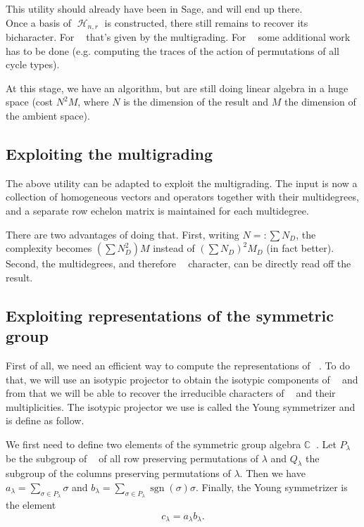 \documentclass[letter,12pt]{article}
\newcommand{\CC}{\mathbb{C}}
\DeclareMathOperator{\Sn}{\mathbb{S}_n}
\DeclareMathOperator{\GLr}{GL_r}
\DeclareMathOperator{\harmonics}{\mathcal{H}}
\DeclareMathOperator{\sgn}{sgn}
\begin{document}
	This utility should already have been in Sage, and will end up there. \\
	
	Once a basis of $\harmonics_{n,r}$ is constructed, there still remains to recover its bicharacter. For $\GLr$ that's given by the multigrading. For $\Sn$ some additional work has to be done (e.g. computing the traces of the action of permutations of all cycle types).
	
	At this stage, we have an algorithm, but are still doing linear algebra in a huge space (cost $N^2 M$, where $N$ is the dimension of the result and $M$ the dimension of the ambient space).
	
	\subsection{Exploiting the multigrading}
	
	The above utility can be adapted to exploit the multigrading. The input is now a collection of homogeneous vectors and operators together with their multidegrees, and a separate row echelon matrix is maintained for each multidegree.
	
	There are two advantages of doing that. 
	First, writing $N=:\sum N_D$, the complexity becomes $(\sum N_D^2) M$ instead of $(\sum N_D)^2M_D$ (in fact better).
	Second, the multidegrees, and therefore $\GLr$ character, can be directly read off the result.
	
	\subsection{Exploiting representations of the symmetric group}
	
	First of all, we need an efficient way to compute the representations of $\Sn$. To do that, we will use an isotypic projector to obtain the isotypic components of $\Sn$ and from that we will be able to recover the irreducible characters of $\Sn$ and their multiplicities. 
	The isotypic projector we use is called the Young symmetrizer and is define as follow.
	
	We first need to define two elements of the symmetric group algebra $\CC \Sn$. Let $P_{\lambda}$ be the subgroup of $\Sn$ of all row preserving permutations of $\lambda$ and $Q_{\lambda}$ the subgroup of the columns preserving permutations of $\lambda$. Then we have $a_{\lambda} = \sum_{\sigma \in P_{\lambda}} \sigma$ and  $b_{\lambda} = \sum_{\sigma \in P_{\lambda}} \sgn(\sigma) \sigma$. Finally, the Young symmetrizer is the element $$c_{\lambda} = a_{\lambda} b_{\lambda}.$$
	
\end{document}
